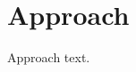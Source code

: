 \ifx\mainfile\undefined

\setcounter{chapter}{2} %
\fi

\cleardoublepage
\chapter{Approach}
\label{chap:approach}

Approach text.

\ifx\mainfile\undefined

\fi
